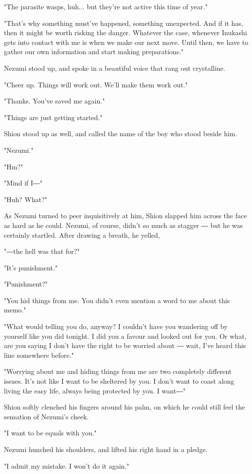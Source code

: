 "The parasite wasps, huh... but they're not active this time of year."

"That's why something must've happened, something unexpected. And if it
has, then it might be worth risking the danger. Whatever the case,
whenever Inukashi gets into contact with me is when we make our next
move. Until then, we have to gather our own information and start making
preparations."

Nezumi stood up, and spoke in a beautiful voice that rang out
crystalline.

"Cheer up. Things will work out. We'll make them work out."

"Thanks. You've saved me again."

"Things are just getting started."

Shion stood up as well, and called the name of the boy who stood beside
him.

"Nezumi."

"Hm?"

"Mind if I―"

"Huh? What?"

As Nezumi turned to peer inquisitively at him, Shion slapped him across
the face as hard as he could. Nezumi, of course, didn't so much as
stagger ― but he was certainly startled. After drawing a breath, he
yelled,

"―the hell was that for?"

"It's punishment."

"Punishment?"

"You hid things from me. You didn't even mention a word to me about this
memo."

"What would telling you do, anyway? I couldn't have you wandering off by
yourself like you did tonight. I did you a favour and looked out for
you. Or what, are you saying I don't have the right to be worried about
― wait, I've heard this line somewhere before."

"Worrying about me and hiding things from me are two completely
different issues. It's not like I want to be sheltered by you. I don't
want to coast along living the easy life, always being protected by you.
I want―"

Shion softly clenched his fingers around his palm, on which he could
still feel the sensation of Nezumi's cheek.

"I want to be equals with you."

Nezumi hunched his shoulders, and lifted his right hand in a pledge.

"I admit my mistake. I won't do it again."

